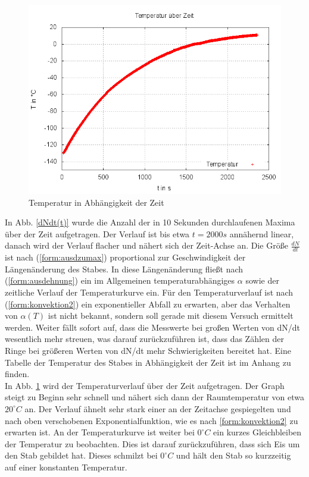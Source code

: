 \begin{figure}
\centering
	\includegraphics[width=.8\textwidth]{images/T(t).png}
\caption{Temperatur in Abhängigkeit der Zeit}
\label{plot:Tt}
\end{figure}

In Abb. \ref{dNdt(t)} wurde die Anzahl der in 10 Sekunden durchlaufenen Maxima über der Zeit aufgetragen. Der Verlauf
ist bis etwa $ t = 2000 s$ annähernd linear, danach wird der Verlauf flacher und nähert sich der Zeit-Achse an. Die Größe
$ \frac{dN}{dt} $ ist nach (\ref{form:ausdzumax}) proportional zur Geschwindigkeit der Längenänderung des Stabes. In diese
Längenänderung fließt nach (\ref{form:ausdehnung}) ein im Allgemeinen temperaturabhängiges $ \alpha $ sowie der zeitliche 
Verlauf der Temperaturkurve ein. Für den Temperaturverlauf ist nach (\ref{form:konvektion2}) ein exponentieller Abfall
zu erwarten, aber das Verhalten von $ \alpha(T) $ ist nicht bekannt, sondern soll gerade mit diesem Versuch ermittelt werden. 
Weiter fällt sofort auf, dass die Messwerte bei großen Werten von dN/dt wesentlich
mehr streuen, was darauf zurückzuführen ist, dass das Zählen der Ringe bei größeren Werten von dN/dt mehr 
Schwierigkeiten bereitet hat.
Eine Tabelle der Temperatur des Stabes in Abhängigkeit der Zeit ist im Anhang zu finden. \\





In Abb. \ref{plot:Tt} wird der Temperaturverlauf über der Zeit aufgetragen. Der Graph steigt zu Beginn sehr schnell und nähert
sich dann der Raumtemperatur von etwa $ 20 ^{\circ} C $ an. Der Verlauf ähnelt sehr stark einer an der Zeitachse 
gespiegelten und nach oben verschobenen Exponentialfunktion, wie es nach \ref{form:konvektion2} zu erwarten ist. 
An der Temperaturkurve ist weiter bei $ 0 ^{\circ} C $ ein kurzes Gleichbleiben der Temperatur zu beobachten. Dies ist darauf zurückzuführen, dass sich Eis um den Stab gebildet hat. Dieses schmilzt bei $ 0 ^{\circ} C $ und hält den Stab so kurzzeitig auf einer konstanten Temperatur.

